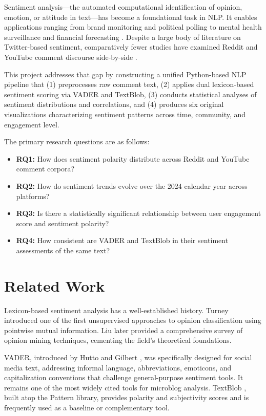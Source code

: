 \documentclass[conference]{IEEEtran}
\begin{document}
Sentiment analysis---the automated computational identification of opinion,
emotion, or attitude in text---has become a foundational task in NLP. It
enables applications ranging from brand monitoring and political polling to
mental health surveillance and financial forecasting \cite{liu2012survey}.
Despite a large body of literature on Twitter-based sentiment, comparatively
fewer studies have examined Reddit and YouTube comment discourse
side-by-side \cite{twitter_reddit_compare}.

This project addresses that gap by constructing a unified Python-based NLP
pipeline that (1) preprocesses raw comment text, (2) applies dual lexicon-based
sentiment scoring via VADER and TextBlob, (3) conducts statistical analyses
of sentiment distributions and correlations, and (4) produces six original
visualizations characterizing sentiment patterns across time, community,
and engagement level.

The primary research questions are as follows:
\begin{itemize}
  \item \textbf{RQ1:} How does sentiment polarity distribute across Reddit
        and YouTube comment corpora?
  \item \textbf{RQ2:} How do sentiment trends evolve over the 2024 calendar
        year across platforms?
  \item \textbf{RQ3:} Is there a statistically significant relationship
        between user engagement score and sentiment polarity?
  \item \textbf{RQ4:} How consistent are VADER and TextBlob in their
        sentiment assessments of the same text?
\end{itemize}

\section{Related Work}

Lexicon-based sentiment analysis has a well-established history. Turney
\cite{turney2002thumbs} introduced one of the first unsupervised approaches
to opinion classification using pointwise mutual information. Liu
\cite{liu2012survey} later provided a comprehensive survey of opinion mining
techniques, cementing the field's theoretical foundations.

VADER, introduced by Hutto and Gilbert \cite{hutto2014vader}, was specifically
designed for social media text, addressing informal language, abbreviations,
emoticons, and capitalization conventions that challenge general-purpose
sentiment tools. It remains one of the most widely cited tools for microblog
analysis. TextBlob \cite{loria2018textblob}, built atop the Pattern library,
provides polarity and subjectivity scores and is frequently used as a baseline
or complementary tool.
\end{document}
